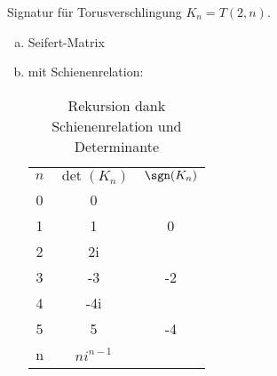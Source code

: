 \begin{ex}
    Signatur für Torusverschlingung $K_n = T(2,n)$.
    \begin{enumerate}[a)]
        \item
            Seifert-Matrix
        \item
            mit Schienenrelation:
            \begin{table}[ht]
                \centering
                \begin{tabular}{ccc}
                    $n$ & $\det(K_n)$ &  $\sgn(K_n)$ \\
                    0 & 0 & \\
                    1 & 1 & 0 \\
                    2 & 2i & \\
                    3 & -3 & -2 \\
                    4 & -4i & \\
                    5 & 5 & -4 \\
                    n & $n i^{n-1}$
                \end{tabular}
                \caption{Rekursion dank Schienenrelation und Determinante}
            \end{table}
    \end{enumerate}
\end{ex}

